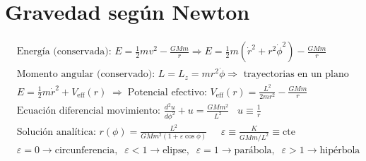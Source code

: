 \section*{Gravedad según Newton }
\begin{align*}
    &\text{Energía (conservada): } E= \frac{1}{2}mv^2 - \frac{GMm}{r}\Rightarrow E = \frac{1}{2}m(\dot{r}^2+ r^2 \dot{\phi}^2 )- \frac{GMm}{r}\\
    &\text{Momento angular (conservado): } L=L_z = mr^2 \dot{\phi}\Rightarrow\text{ trayectorias en un plano}\\
    &E=\frac{1}{2}m\dot{r}^2 +V_{\text{eff}}(r)\;  \Rightarrow \;\text{Potencial efectivo: } V_{\text{eff}}(r)= \frac{L^2}{2mr^2}- \frac{GMm}{r}\\
    &\text{Ecuación diferencial movimiento: } \frac{d^2 u}{d\phi^2} + u=\frac{GMm^2}{L^2}\; \; \;u \equiv \frac{1}{r}\\
    &\text{Solución analítica: }r(\phi)=\frac{L^2}{GMm^2(1+\varepsilon \cos \phi)}\; \; \; \; \; \varepsilon \equiv \frac{K}{GMm/L^2}\equiv\text{cte}\\
    &\varepsilon = 0 \rightarrow \text{circunferencia}, \; \; \varepsilon < 1 \rightarrow \text{elipse}, \; \; 
    \varepsilon = 1 \rightarrow \text{parábola}, \; \; 
    \varepsilon >1 \rightarrow \text{hipérbola}
\end{align*}